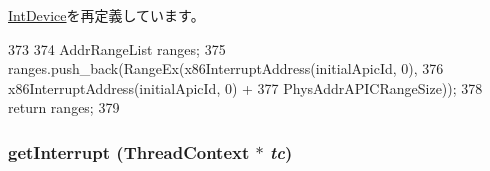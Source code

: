 \hyperlink{classX86ISA_1_1IntDevice_ac142ed8f5e7f1e45022f45d316e131a3}{IntDevice}を再定義しています。


\begin{DoxyCode}
373 {
374     AddrRangeList ranges;
375     ranges.push_back(RangeEx(x86InterruptAddress(initialApicId, 0),
376                              x86InterruptAddress(initialApicId, 0) +
377                              PhysAddrAPICRangeSize));
378     return ranges;
379 }
\end{DoxyCode}
\hypertarget{classX86ISA_1_1Interrupts_ae603c88d759977611d3bcc6e2deb61ae}{
\subsubsection[{getInterrupt}]{ getInterrupt ({\bf ThreadContext} $\ast$ {\em tc})}}
\label{classX86ISA_1_1Interrupts_ae603c88d759977611d3bcc6e2deb61ae}



